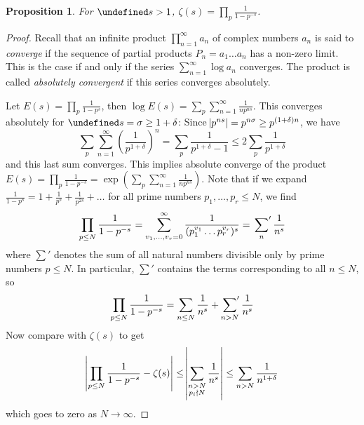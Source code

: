 \documentclass[11pt]{article}
\theoremstyle{definition}
\theoremstyle{plain}
\newtheorem{proposition}[definition]{Proposition}
\theoremstyle{remark}
\let\Re\undefined
\DeclareMathOperator{\Re}{Re}
\begin{document}
\begin{proposition}\label{prop:5_7}
    For $\Re s > 1$, $\zeta(s) = \prod_p \frac{1}{1-p^{-s}}$.
\end{proposition}
\begin{proof}
    Recall that an infinite product $\prod_{n=1}^\infty a_n$ of complex numbers $a_n$ is said to \emph{converge} if the sequence of partial products $P_n = a_1 \ldots a_n$ has a non-zero limit. This is the case if and only if the series $\sum_{n=1}^\infty \log a_n$ converges. The product is called \emph{absolutely convergent} if this series converges absolutely.

    Let $E(s) = \prod_p \frac{1}{1-p^s}$, then $\log E(s) = \sum_p \sum_{n=1}^\infty \frac{1}{n p^{ns}}$. This converges absolutely for $\Re s = \sigma \ge 1 + \delta$: Since $\abs{p^{ns}} = p^{n \sigma} \ge p^{(1+\delta) n}$, we have
    \begin{equation*}
        \sum_p \sum_{n=1}^\infty \left(\frac{1}{p^{1+\delta}}\right)^n = \sum_p \frac{1}{p^{1+\delta}-1} \le 2 \sum_p \frac{1}{p^{1+\delta}}
    \end{equation*}
    and this last sum converges. This implies absolute converge of the product $E(s) = \prod_p \frac{1}{1-p^{-s}} = \exp\left(\sum_p \sum_{n=1}^\infty \frac{1}{n p^{ns}}\right)$. Note that if we expand $\frac{1}{1-p^s} = 1+\frac{1}{p^s}+\frac{1}{p^{2s}}+\ldots$ for all prime numbers $p_1, \ldots, p_r \le N$, we find
    \begin{equation*}
        \prod_{p \le N} \frac{1}{1-p^{-s}} = \sum_{v_1, \ldots, v_r = 0}^{\infty} \frac{1}{(p_1^{v_1} \ldots p_r^{v_r})^s} = \sideset{}{'}\sum_n \frac{1}{n^s}
    \end{equation*}
    where $\sum'$ denotes the sum of all natural numbers divisible only by prime numbers $p \le N$. In particular, $\sum'$ contains the terms corresponding to all $n \le N$, so
    \begin{equation*}
        \prod_{p \le N} \frac{1}{1-p^{-s}} = \sum_{n \le N} \frac{1}{n^s} + \sideset{}{'}\sum_{n > N} \frac{1}{n^s}
    \end{equation*}
    Now compare with $\zeta(s)$ to get
    \begin{equation*}
        \abs{\prod_{p \le N} \frac{1}{1-p^{-s}} - \zeta(s)} \le \abs{\sum_{\substack{n > N \\ p_i \nmid N}} \frac{1}{n^s}} \le \sum_{n > N} \frac{1}{n^{1+\delta}}
    \end{equation*}
    which goes to zero as $N \to \infty$.
\end{proof}
\end{document}
